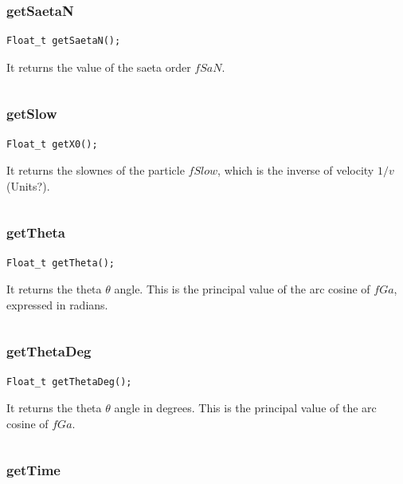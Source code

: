 \documentclass[a4paper]{book}
\begin{document}
\subsubsection{getSaetaN}

\begin{lstlisting}[style=customc]
Float_t getSaetaN();
\end{lstlisting}

It returns the value of the saeta order $fSaN$.

\[\]

\subsubsection{getSlow}

\begin{lstlisting}[style=customc]
Float_t getX0();
\end{lstlisting}

It returns the slownes of the particle $fSlow$, which is the inverse of velocity $1/v$ (Units?).

\[\]

\subsubsection{getTheta}

\begin{lstlisting}[style=customc]
Float_t getTheta();
\end{lstlisting}

It returns the theta $\theta$ angle. This is the principal value of the arc cosine of $fGa$, expressed in radians.

\[\]

\subsubsection{getThetaDeg}

\begin{lstlisting}[style=customc]
Float_t getThetaDeg();
\end{lstlisting}

It returns the theta $\theta$ angle in degrees. This is the principal value of the arc cosine of $fGa$.

\[\]

\subsubsection{getTime}
\end{document}
